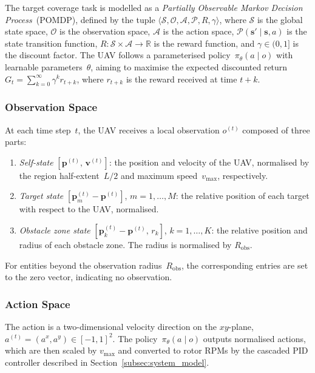 The target coverage task is modelled as a
\emph{Partially Observable Markov Decision Process}~(POMDP),
defined by the tuple
$\langle \mathcal{S}, \mathcal{O}, \mathcal{A}, \mathcal{P}, R, \gamma
\rangle$,
where $\mathcal{S}$ is the global state space,
$\mathcal{O}$ is the observation space,
$\mathcal{A}$ is the action space,
$\mathcal{P}(\mathbf{s}' \mid \mathbf{s}, a)$ is the state transition function,
$R: \mathcal{S} \times \mathcal{A} \to \mathbb{R}$ is the reward function, and
$\gamma \in (0,1]$ is the discount factor.
The UAV follows a parameterised policy~$\pi_{\theta}(a \mid o)$ with learnable
parameters~$\theta$, aiming to maximise the expected discounted return
$G_t = \sum_{k=0}^{\infty} \gamma^k r_{t+k}$, where $r_{t+k}$ is the reward
received at time $t+k$.

\subsubsection{Observation Space}
\label{subsubsec:observation}

At each time step~$t$, the UAV receives a local observation $o^{(t)}$ composed
of three parts:
\begin{enumerate}
  \item \emph{Self-state}
    $[\mathbf{p}^{(t)},\, \mathbf{v}^{(t)}]$:
    the position and velocity of the UAV, normalised by the region half-extent~$L/2$
    and maximum speed~$v_{\max}$, respectively.
  \item \emph{Target state}
    $[\mathbf{p}_m^{(t)} - \mathbf{p}^{(t)}]$,
    $m = 1,\dots,M$:
    the relative position of each target with respect to the UAV, normalised.
  \item \emph{Obstacle zone state}
    $[\mathbf{p}_k^{(t)} - \mathbf{p}^{(t)},\, r_k]$,
    $k = 1,\dots,K$:
    the relative position and radius of each obstacle zone.
    The radius is normalised by $R_{\mathrm{obs}}$.
\end{enumerate}
For entities beyond the observation radius~$R_{\mathrm{obs}}$, the
corresponding entries are set to the zero vector, indicating no observation.

\subsubsection{Action Space}
\label{subsubsec:action}

The action is a two-dimensional velocity direction on the $xy$-plane,
$a^{(t)} = (a^{x}, a^{y}) \in [-1,1]^{2}$.
The policy~$\pi_{\theta}(a \mid o)$ outputs normalised actions, which are
then scaled by $v_{\max}$ and converted to rotor RPMs by the cascaded PID
controller described in Section~\ref{subsec:system_model}.

